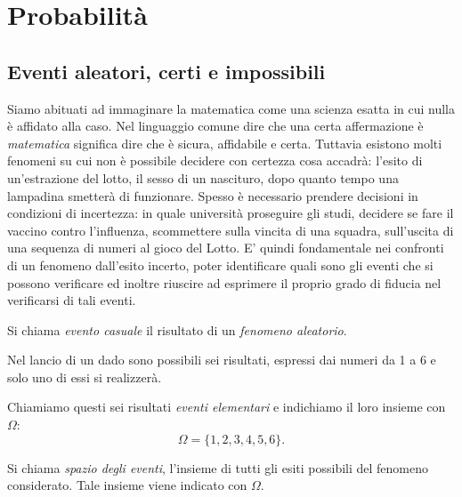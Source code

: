 
\chapter{Probabilità}


\section{Eventi aleatori, certi e impossibili}
\label{sec:01_intro}

Siamo abituati ad immaginare la matematica come una scienza esatta in cui nulla 
è affidato alla caso. Nel linguaggio comune dire che una certa affermazione è 
\emph{matematica} significa dire che è sicura, affidabile e certa. Tuttavia 
esistono molti fenomeni su cui non è possibile decidere con certezza cosa 
accadrà: l'esito di un'estrazione del lotto, il sesso di un nascituro, dopo 
quanto tempo una lampadina smetterà di funzionare. Spesso è necessario prendere 
decisioni in condizioni di incertezza: in quale università proseguire gli 
studi, decidere se fare il vaccino contro l'influenza, scommettere sulla vincita 
di una squadra, sull'uscita di una sequenza di numeri al gioco del Lotto. E' 
quindi fondamentale nei confronti di un fenomeno dall'esito incerto, poter 
identificare quali sono gli eventi che si possono verificare ed inoltre riuscire 
ad esprimere il proprio grado di fiducia nel verificarsi di tali eventi.

\begin{definizione}
Si chiama \emph{evento casuale} il risultato di un \emph{fenomeno aleatorio}.
\end{definizione}
Nel lancio di un dado sono possibili sei risultati, espressi dai numeri da 1 a 
6 
e solo uno di essi si realizzerà.

Chiamiamo questi sei risultati \emph{eventi elementari} e indichiamo il loro 
insieme con 
\(\Omega:\) 
\[\Omega =\{1,2,3,4,5,6\}.\]

\begin{definizione}
Si chiama \emph{spazio degli eventi}, l'insieme di tutti gli esiti possibili 
del 
fenomeno considerato. Tale insieme viene indicato con \(\Omega \).
\end{definizione}

